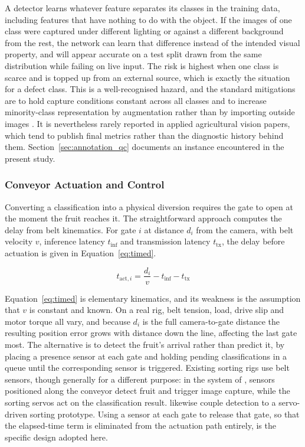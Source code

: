 A detector learns whatever feature separates its classes in the training data, including features that have nothing to do with the object. If the images of one class were captured under different lighting or against a different background from the rest, the network can learn that difference instead of the intended visual property, and will appear accurate on a test split drawn from the same distribution while failing on live input. The risk is highest when one class is scarce and is topped up from an external source, which is exactly the situation for a defect class. This is a well-recognised hazard, and the standard mitigations are to hold capture conditions constant across all classes and to increase minority-class representation by augmentation rather than by importing outside images \citep{shorten2019, buslaev2020}. It is nevertheless rarely reported in applied agricultural vision papers, which tend to publish final metrics rather than the diagnostic history behind them. Section~\ref{sec:annotation_qc} documents an instance encountered in the present study.

\subsubsection{Conveyor Actuation and Control}
\label{sec:actuation}

Converting a classification into a physical diversion requires the gate to open at the moment the fruit reaches it. The straightforward approach computes the delay from belt kinematics. For gate $i$ at distance $d_i$ from the camera, with belt velocity $v$, inference latency $t_{\text{inf}}$ and transmission latency $t_{\text{tx}}$, the delay before actuation is given in Equation~\eqref{eq:timed}.

\begin{equation}
    t_{\text{act},i} = \frac{d_i}{v} - t_{\text{inf}} - t_{\text{tx}}
    \label{eq:timed}
\end{equation}

Equation~\eqref{eq:timed} is elementary kinematics, and its weakness is the assumption that $v$ is constant and known. On a real rig, belt tension, load, drive slip and motor torque all vary, and because $d_i$ is the full camera-to-gate distance the resulting position error grows with distance down the line, affecting the last gate most. The alternative is to detect the fruit's arrival rather than predict it, by placing a presence sensor at each gate and holding pending classifications in a queue until the corresponding sensor is triggered. Existing sorting rigs use belt sensors, though generally for a different purpose: in the system of \citet{moya2025}, sensors positioned along the conveyor detect fruit and trigger image capture, while the sorting servos act on the classification result. \citet{geetha2025} likewise couple detection to a servo-driven sorting prototype. Using a sensor at each gate to release that gate, so that the elapsed-time term is eliminated from the actuation path entirely, is the specific design adopted here.


